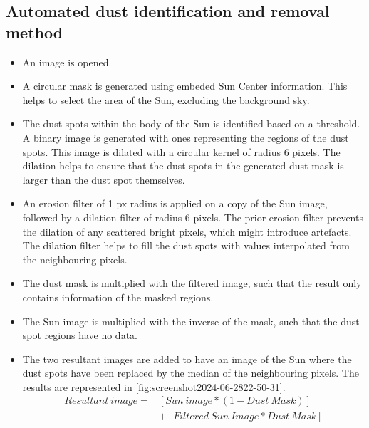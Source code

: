 \documentclass[11pt,a4paper]{article}
\begin{document}
	\subsection{Automated dust identification and removal method}

	\begin{itemize}
		\item An image is opened.
		\item A circular mask is generated using embeded Sun Center information. This helps to select the area of the Sun, excluding the background sky.
		\item The dust spots within the body of the Sun is identified based on a threshold. A binary image is generated with ones representing the regions of the dust spots. This image is dilated with a circular kernel of radius 6 pixels. The dilation helps to ensure that the dust spots in the generated dust mask is larger than the dust spot themselves.
		\item An erosion filter of 1 px radius is applied on a copy of the Sun image, followed by a dilation filter of radius 6 pixels. The prior erosion filter prevents the dilation of any scattered bright pixels, which might introduce artefacts. The dilation filter helps to fill the dust spots with values interpolated from the neighbouring pixels.
		\item The dust mask is multiplied with the filtered image, such that the result only contains information of the masked regions.
		\item The Sun image is multiplied with the inverse of the mask, such that the dust spot regions have no data.
		\item The two resultant images are added to have an image of the Sun where the dust spots have been replaced by the median of the neighbouring pixels. The results are represented in \ref{fig:screenshot2024-06-2822-50-31}.
		\begin{align*}
			Resultant~image = &[Sun~image * (1-Dust~Mask) ]\\
			&+ [Filtered~Sun~Image * Dust~Mask]
		\end{align*}
	\end{itemize}
	
\end{document}
